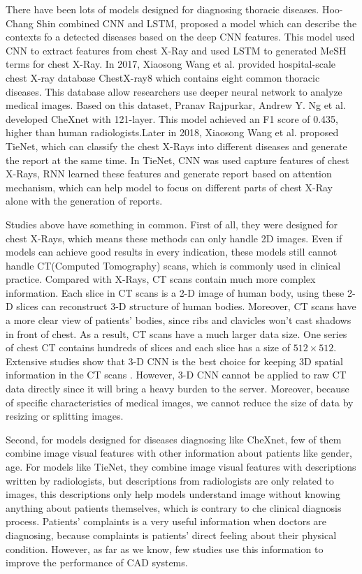 \documentclass[runningheads]{llncs}
\begin{document}
There have been lots of models designed for diagnosing thoracic diseases.
Hoo-Chang Shin \cite{Shin2016Learning} combined CNN and LSTM\cite{hochreiter1997long},  proposed a model which can describe the contexts fo a detected diseases based on the deep CNN features. This model used CNN to extract features from chest X-Ray and used LSTM to generated MeSH\cite{timmurphy.org} terms for chest X-Ray. In 2017, Xiaosong Wang et al.\cite{Wang2017ChestX} provided hospital-scale chest X-ray database ChestX-ray8 which contains eight common thoracic diseases. This database allow researchers use deeper neural network to analyze medical images. Based on this dataset, Pranav Rajpurkar, Andrew Y. Ng et al. \cite{Rajpurkar2017CheXNet} developed CheXnet with 121-layer. This model achieved an F1 score of 0.435, higher than human radiologists.Later in 2018,  Xiaosong Wang et al.\cite{Wang2018TieNet} proposed TieNet, which can classify the chest X-Rays into different diseases and generate the report at the same time. In TieNet, CNN was used capture features of chest X-Rays, RNN learned these features and generate report based on attention mechanism, which can help model to focus on different parts of chest X-Ray alone with the generation of reports. 

Studies above have something in common. First of all, they were designed for chest X-Rays, which means these methods can only handle 2D images. Even if models can achieve good results in every indication, these models still cannot handle CT(Computed Tomography) scans, which is commonly used in clinical practice. Compared with  X-Rays, CT scans contain much more complex information.  Each slice in CT scans is a 2-D image of human body, using these 2-D slices can reconstruct 3-D structure of human bodies. Moreover, CT scans  have a more clear view of patients' bodies, since ribs and clavicles won't cast shadows in front of chest. As a result, CT scans have a much larger data size. One series of chest CT contains hundreds of slices and each slice has a size of $512 \times 512$.  Extensive studies show that 3-D CNN is  the best choice for keeping 3D spatial information in the CT scans \cite{Yorozu1987Electron}. However, 3-D CNN cannot be applied to raw CT data directly since it will bring a heavy burden to the server. Moreover, because of specific characteristics of medical images, we cannot reduce the size of data by resizing or splitting images.

Second, for models designed for diseases diagnosing like CheXnet, few of them combine image visual features with other information about patients like gender, age. For models like TieNet, they combine image visual features with descriptions written by radiologists, but descriptions from radiologists are only related to images, this descriptions only help models understand image without knowing anything about patients themselves, which is contrary to che clinical diagnosis process. Patients' complaints is a very useful information when doctors are diagnosing, because complaints is patients' direct feeling about their physical condition. However, as far as we know, few studies use this information to improve the performance of CAD systems.
\end{document}
